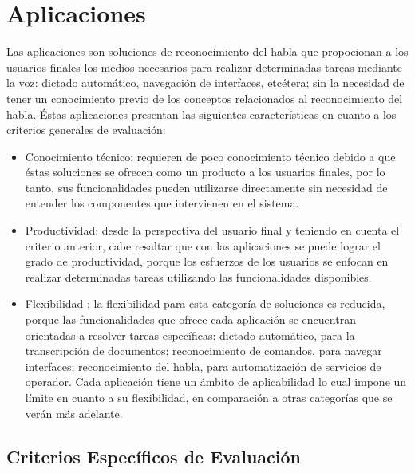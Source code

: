 \section{Aplicaciones}
\label{sec:aplicaciones}


Las aplicaciones son soluciones de reconocimiento del habla que propocionan
a los usuarios finales los medios necesarios para realizar determinadas tareas mediante
la voz: dictado autom\'atico, navegaci\'on de interfaces, etc\'etera; sin
la necesidad de tener un conocimiento previo de los conceptos relacionados al
reconocimiento del habla. \'Estas aplicaciones presentan las siguientes 
caracter\'isticas en cuanto a los criterios generales de evaluaci\'on:

\begin{itemize}
    \item Conocimiento t\'ecnico: requieren de poco conocimiento  t\'ecnico debido a que \'estas
        soluciones se ofrecen como un producto a los usuarios finales, por lo tanto, sus funcionalidades
        pueden utilizarse directamente sin necesidad de entender los componentes que intervienen
        en el sistema.
    \item Productividad: desde la perspectiva del usuario final y teniendo en cuenta el criterio anterior, cabe resaltar que con
        las aplicaciones se puede lograr el grado de productividad, porque los esfuerzos
        de los usuarios se enfocan en realizar determinadas tareas utilizando las funcionalidades
        disponibles.
    \item Flexibilidad : la flexibilidad para esta categor\'ia de soluciones es reducida, porque las
        funcionalidades que ofrece cada aplicaci\'on se encuentran orientadas a resolver tareas
        espec\'ificas: dictado autom\'atico, para la transcripci\'on de documentos; reconocimiento
        de comandos, para navegar interfaces; reconocimiento del habla, para 
        automatizaci\'on de servicios de operador. Cada aplicaci\'on tiene un \'ambito de aplicabilidad
        lo cual impone un l\'imite en cuanto a su flexibilidad, en comparaci\'on a otras categor\'ias que
        se ver\'an m\'as adelante.
\end{itemize}

\subsection{Criterios Espec\'ificos de Evaluaci\'on}

